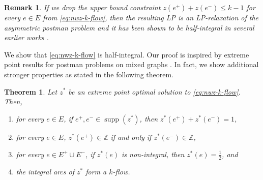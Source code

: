 \documentclass[11pt]{article}
\newtheorem{theorem}{Theorem}
\newtheorem{remark}{Remark}
\newcommand{\Z}{\mathbb{Z}}
\DeclareMathOperator{\supp}{supp}
\begin{document}
\begin{remark}
If we drop the upper bound constraint $z(e^+)+z(e^-)\leq k-1$ for every $e\in E$ from \eqref{eq:nwz-k-flow}, then the resulting LP is an LP-relaxation of the asymmetric postman problem and it has been shown to be half-integral in several earlier works \cite{kappauf1979mixed, win1989windy, ralphs1993mixed, zaragoza2003postman}. 
\end{remark}

We show that \eqref{eq:nwz-k-flow} is half-integral. Our proof is inspired by extreme point results for postman problems on mixed graphs \cite{zaragoza2003postman}. In fact, we show additional stronger properties as stated in the following theorem.


\begin{theorem}\label{thm:APP_half_integral}
Let $z^*$ be an extreme point optimal solution to \eqref{eq:nwz-k-flow}. Then,
\begin{enumerate}[label={(\arabic*)}]
    \item for every $e\in E$, if $e^+,e^-\in \supp(z^*)$, then $z^*(e^+)+z^*(e^-)=1$, 
    \item for every $e\in E$, $z^*(e^+)\in \Z$ if and only if $z^*(e^-)\in \Z$, 
    \item for every $e\in E^+\cup E^-$, if $z^*(e)$ is non-integral, then $z^*(e)=\frac{1}{2}$, and 
    \item the integral arcs of $z^*$ form a $k$-flow.
\end{enumerate}
\end{theorem}
\end{document}

